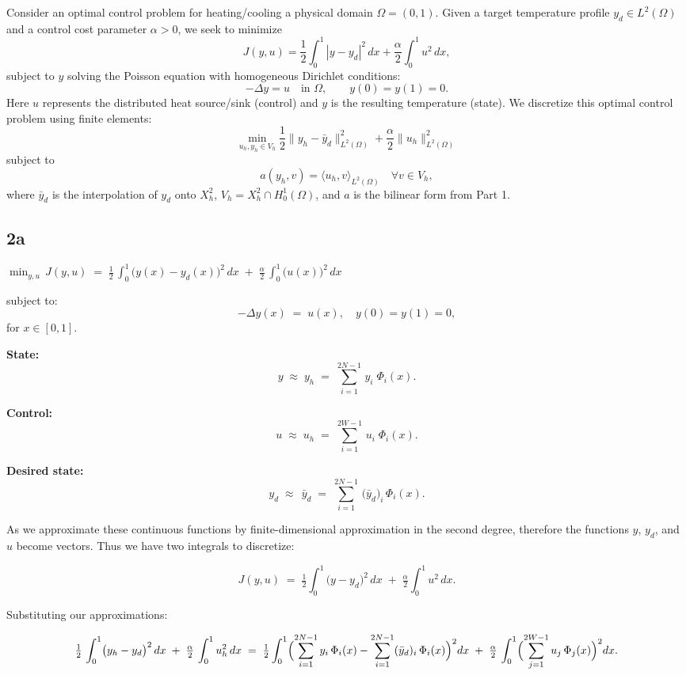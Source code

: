 \documentclass[a4paper,10pt]{article}
\begin{document}
Consider an optimal control problem for heating/cooling a physical domain $\Omega=(0,1)$.
Given a target temperature profile $y_d \in L^2(\Omega)$ and a control cost parameter $\alpha > 0$, we seek to minimize
$$
	J(y,u) = \frac{1}{2}\int_0^1 |y-y_d|^2\,dx + \frac{\alpha}{2}\int_0^1 u^2\,dx,
$$
subject to $y$ solving the Poisson equation with homogeneous Dirichlet conditions:
$$
	-\Delta y = u \quad\text{in }\Omega, \qquad y(0) = y(1) = 0.
$$
Here $u$ represents the distributed heat source/sink (control) and $y$ is the resulting temperature (state).
We discretize this optimal control problem using finite elements:
\[
	\min_{u_h,y_h\in V_h} \frac{1}{2}\|y_h - \bar{y}_d\|^2_{L^2(\Omega)} + \frac{\alpha}{2}\|u_h\|^2_{L^2(\Omega)}
\]
subject to
\[
	a(y_h,v) = \langle u_h,v \rangle_{L^2(\Omega)} \quad \forall v\in V_h,
\]
where $\bar{y}_d$ is the interpolation of $y_d$ onto $X^2_h$, $V_h = X^2_h \cap H^1_0(\Omega)$, and $a$ is the bilinear form from Part 1.


\subsection{2a}

\noindent
$\displaystyle
\min_{y,u}\,J(y,u)
\;=\;
\tfrac12\,\int_{0}^{1}\bigl(y(x)-y_{d}(x)\bigr)^{2}\,dx
\;+\;\tfrac{\alpha}{2}\,\int_{0}^{1}\bigl(u(x)\bigr)^{2}\,dx
$

\noindent
subject to:
\[
-\Delta y(x)\;=\;u(x),\quad y(0)=y(1)=0,
\]
\noindent
for $x\in[0,1]$.

\bigskip

\noindent
\textbf{State:} 
\[
y \;\approx\; y_{h}
\;=\;
\sum_{i=1}^{2N-1}\,y_{i}\;\Phi_{i}(x).
\]

\noindent
\textbf{Control:} 
\[
u \;\approx\; u_{h}
\;=\;
\sum_{i=1}^{2W-1}\,u_{i}\;\Phi_{i}(x).
\]

\noindent
\textbf{Desired state:}
\[
y_{d}\;\approx\;\,\bar{y}_{d}
\;=\;
\sum_{i=1}^{2N-1}\,\bigl(\bar{y}_{d}\bigr)_{i}\,\Phi_{i}(x).
\]

\noindent
As we approximate these continuous functions by finite-dimensional approximation in the second degree,
therefore the functions $y$, $y_{d}$, and $u$ become vectors. Thus we have two integrals to discretize:

\[
J(y,u)
\;=\;
\tfrac12\int_{0}^{1}\bigl(y - y_{d}\bigr)^{2}\,dx
\;+\;
\tfrac{\alpha}{2}\int_{0}^{1}u^{2}\,dx.
\]

\noindent
Substituting our approximations:

\[
\tfrac12\,\int_{0}^{1}\bigl(y_{h}-y_{d}\bigr)^{2}\,dx
\;+\;
\tfrac{\alpha}{2}\,\int_{0}^{1}u_{h}^{2}\,dx
\;=\;
\tfrac12 \int_{0}^{1}
\Bigl(\sum_{i=1}^{2N-1}y_{i}\,\Phi_{i}(x)
-
\sum_{i=1}^{2N-1}(\bar{y}_{d})_{i}\,\Phi_{i}(x)\Bigr)^{2}
dx
\;+\;
\tfrac{\alpha}{2}\,\int_{0}^{1}
\Bigl(\sum_{j=1}^{2W-1}u_{j}\,\Phi_{j}(x)\Bigr)^{2}dx.
\]
\end{document}
